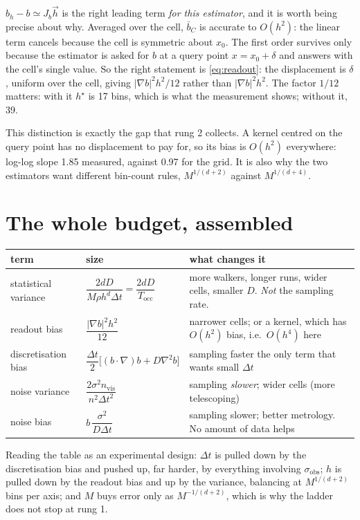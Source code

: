 \documentclass[11pt,a4paper]{article}
\newcommand{\dt}{\Delta t}
\begin{document}
$b_h-b\simeq J_b\vec h$ is the right leading term \emph{for this estimator}, and it is
worth being precise about why. Averaged over the cell, $\bar b_C$ is accurate to
$O(h^{2})$: the linear term cancels because the cell is symmetric about $x_0$. The first
order survives only because the estimator is asked for $b$ at a query point
$x=x_0+\delta$ and answers with the cell's single value. So the right statement is
\eqref{eq:readout}: the displacement is $\delta$, uniform over the cell, giving
$|\nabla b|^{2}h^{2}/12$ rather than $|\nabla b|^{2}h^{2}$. The factor $1/12$ matters:
with it $h^{\star}$ is 17 bins, which is what the measurement shows; without it, 39.

\begin{keybox}
This distinction is exactly the gap that rung 2 collects. A kernel centred on the query
point has no displacement to pay for, so its bias is $O(h^{2})$ everywhere: log-log
slope 1.85 measured, against 0.97 for the grid. It is also why the two estimators want
different bin-count rules, $M^{1/(d+2)}$ against $M^{1/(d+4)}$.
\end{keybox}

\section{The whole budget, assembled}

\begin{center}
\small
\begin{tabular}{@{}L{0.30\textwidth} L{0.30\textwidth} L{0.32\textwidth}@{}}
\toprule
\textbf{term} & \textbf{size} & \textbf{what changes it} \\
\midrule
statistical variance & $\dfrac{2dD}{M\rho h^{d}\dt}=\dfrac{2dD}{T_{\mathrm{occ}}}$ &
more walkers, longer runs, wider cells, smaller $D$. \emph{Not} the sampling rate. \\
readout bias & $\dfrac{|\nabla b|^{2}h^{2}}{12}$ &
narrower cells; or a kernel, which has $O(h^{2})$ bias, i.e.\ $O(h^{4})$ here \\
discretisation bias & $\dfrac{\dt}{2}\big[(b\!\cdot\!\nabla)b+D\nabla^{2}b\big]$ &
sampling faster \textemdash{} the only term that wants small $\dt$ \\
noise variance & $\dfrac{2\sigma^{2}n_{\mathrm{vis}}}{n^{2}\dt^{2}}$ &
sampling \emph{slower}; wider cells (more telescoping) \\
noise bias & $b\,\dfrac{\sigma^{2}}{D\dt}$ &
sampling slower; better metrology. No amount of data helps \\
\bottomrule
\end{tabular}
\end{center}

Reading the table as an experimental design: $\dt$ is pulled down by the discretisation
bias and pushed up, far harder, by everything involving $\sigma_{\mathrm{obs}}$; $h$ is
pulled down by the readout bias and up by the variance, balancing at
$M^{1/(d+2)}$ bins per axis; and $M$ buys error only as $M^{-1/(d+2)}$, which is why
the ladder does not stop at rung 1.
\end{document}
